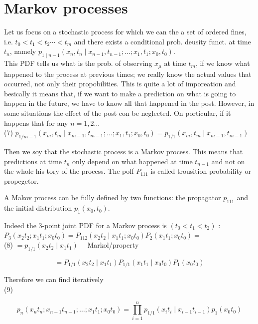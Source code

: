 \documentclass[10pt]{article}
\begin{document}
\section*{Markov processes}
Let us focus on a stochastic process for which we can the a set of ordered fines, i.e. $t_{0}<t_{1}<t_{2} \cdots<t_{m}$ and there exists a conditional prob. deusity funct. at time $t_{n}$, namely $p_{1 \mid n-1}\left(x_{n}, t_{n} \mid x_{n-1}, t_{n-1} ; \ldots ; x_{1}, t_{1} ; x_{0}, t_{0}\right)$.\\
This PDF tells us what is the prob. of observing $x_{\mu}$ at time $t_{m}$, if we know what happened to the process at previous times; we really know the actual values that occurred, not only their propobilities. This is quite a lot of imporeation and besically it means that, if we want to make a prediction on what is going to happen in the future, we have to know all that happened in the post. However, in some situations the effect of the post con be neglected. On porticular, if it happens that for any $n=1,2 \ldots$\\
(7) $p_{1 / m-1}\left(x_{m}, t_{m} \mid x_{m-1}, t_{m-1} ; \ldots ; x_{1}, t_{1} ; x_{0}, t_{0}\right)=p_{1 / 1}\left(x_{m}, t_{m} \mid x_{m-1}, t_{m-1}\right)$

Then we soy that the stochastic process is a Markov process. This means that predictions at time $t_{n}$ only depend on what happened at time $t_{n-1}$ and not on the whole his tory of the process. The polf $P_{111}$ is called trousition probability or propegetor.

A Makov process con be fully defined by two functions: the propagator $p_{111}$ and the initial distribution $p_{1}\left(x_{0}, t_{0}\right)$.

Indeed the 3-point joint PDF for a Markov process is $\left(t_{0}<t_{1}<t_{2}\right)$ :\\
$P_{3}\left(x_{2} t_{2} ; x_{1} t_{1} ; x_{0} t_{0}\right)=P_{112}\left(x_{2} t_{2} \mid x_{1} t_{1} ; x_{0} t_{0}\right) P_{2}\left(x_{1} t_{1} ; x_{0} t_{0}\right)=$\\
(8) $=p_{1 / 1}\left(x_{2} t_{2} \mid x_{1} t_{1}\right) \quad$ Markol/property

$$
=P_{1 / 1}\left(x_{2} t_{2} \mid x_{1} t_{1}\right) P_{1 / 1}\left(x_{1} t_{1} \mid x_{0} t_{0}\right) P_{1}\left(x_{0} t_{0}\right)
$$

Therefore we can find iteratively\\
(9)

$$
p_{n}\left(x_{n} t_{n} ; x_{n-1} t_{n-1} ; \ldots ; x_{1} t_{1} ; x_{0} t_{0}\right)=\prod_{i=1}^{n} p_{1 / 1}\left(x_{i} t_{i} \mid x_{i-1} t_{i-1}\right) p_{1}\left(x_{0} t_{0}\right)
$$
\end{document}
